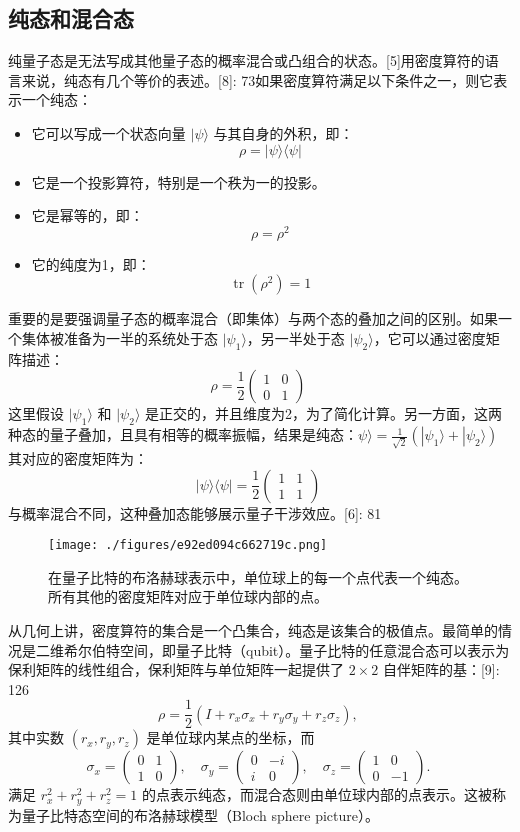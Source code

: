 \subsection{纯态和混合态}
纯量子态是无法写成其他量子态的概率混合或凸组合的状态。[5]用密度算符的语言来说，纯态有几个等价的表述。[8]: 73如果密度算符满足以下条件之一，则它表示一个纯态：
\begin{itemize}
\item 它可以写成一个状态向量 \(|\psi \rangle\) 与其自身的外积，即： 
  \[
  \rho = |\psi \rangle \langle \psi |~
  \]
\item 它是一个投影算符，特别是一个秩为一的投影。
\item 它是幂等的，即：
  \[
  \rho = \rho^2~
  \]
\item 它的纯度为1，即： 
  \[
  \operatorname{tr}(\rho^2) = 1~
  \]
\end{itemize}
重要的是要强调量子态的概率混合（即集体）与两个态的叠加之间的区别。如果一个集体被准备为一半的系统处于态 \(|\psi_1\rangle\)，另一半处于态 \(|\psi_2\rangle\)，它可以通过密度矩阵描述：
\[
\rho = \frac{1}{2} \begin{pmatrix} 1 & 0 \\ 0 & 1 \end{pmatrix}~
\]
这里假设 \(|\psi_1\rangle\) 和 \(|\psi_2\rangle\) 是正交的，并且维度为2，为了简化计算。另一方面，这两种态的量子叠加，且具有相等的概率振幅，结果是纯态：\(\psi\rangle = \frac{1}{\sqrt{2}} (|\psi_1\rangle + |\psi_2\rangle)\)
其对应的密度矩阵为：
\[
|\psi \rangle \langle \psi | = \frac{1}{2} \begin{pmatrix} 1 & 1 \\ 1 & 1 \end{pmatrix}~
\]
与概率混合不同，这种叠加态能够展示量子干涉效应。[6]: 81
\begin{figure}[ht]
\centering
\texttt{[image: ./figures/e92ed094c662719c.png]}
\caption{在量子比特的布洛赫球表示中，单位球上的每一个点代表一个纯态。所有其他的密度矩阵对应于单位球内部的点。} \label{fig_MDJZ_1}
\end{figure}
从几何上讲，密度算符的集合是一个凸集合，纯态是该集合的极值点。最简单的情况是二维希尔伯特空间，即量子比特（qubit）。量子比特的任意混合态可以表示为保利矩阵的线性组合，保利矩阵与单位矩阵一起提供了 \(2 \times 2\) 自伴矩阵的基：[9]: 126 
\[
\rho = \frac{1}{2} \left(I + r_x \sigma_x + r_y \sigma_y + r_z \sigma_z\right),~
\]
其中实数 \((r_x, r_y, r_z)\) 是单位球内某点的坐标，而
\[
\sigma_x = \begin{pmatrix} 0 & 1 \\ 1 & 0 \end{pmatrix}, \quad \sigma_y = \begin{pmatrix} 0 & -i \\ i & 0 \end{pmatrix}, \quad \sigma_z = \begin{pmatrix} 1 & 0 \\ 0 & -1 \end{pmatrix}.~
\]
满足 \(r_x^2 + r_y^2 + r_z^2 = 1\) 的点表示纯态，而混合态则由单位球内部的点表示。这被称为量子比特态空间的布洛赫球模型（Bloch sphere picture）。
